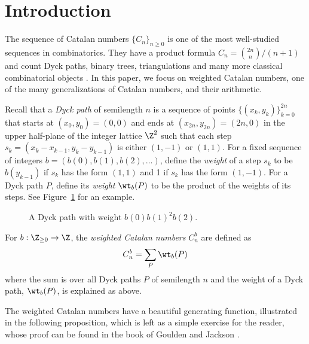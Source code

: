 
\section{Introduction}\label{sec:intro}
The sequence of Catalan numbers $\{C_n\}_{n\geq0}$ is one of the most well-studied sequences in combinatorics. They have a product formula $C_n=\binom{2n}{n}/(n+1)$ and count Dyck paths, binary trees, triangulations and many more classical combinatorial objects \cite{stanley2015catalan}. In this paper, we focus on weighted Catalan numbers, one of the many generalizations of Catalan numbers, and their arithmetic.

Recall that a \textit{Dyck path} of semilength $n$ is a sequence of points $\{(x_k,y_k)\}_{k=0}^{2n}$ that starts at $(x_0,y_0)=(0,0)$ and ends at $(x_{2n},y_{2n})=(2n,0)$  in the upper half-plane of the integer lattice $\Z^2$ such that each step $s_k=(x_{k}-x_{k-1},y_{k}-y_{k-1})$ is either $(1,-1)$ or $(1,1)$. For a fixed sequence of integers $b=(b(0),b(1),b(2),\ldots)$, define the \textit{weight} of a step $s_k$ to be $b(y_{k-1})$ if $s_k$ has the form $(1,1)$ and 1 if $s_k$ has the form $(1,-1)$. For a Dyck path $P$, define its \textit{weight} $\wt_b(P)$ to be the product of the weights of its steps. See Figure~\ref{fig:dyckpath} for an example.
\begin{figure}[h!]
\centering
{}
\caption{A Dyck path with weight $b(0)b(1)^2b(2)$.}
\label{fig:dyckpath}
\end{figure}
\begin{definition}
For $b:\Z_{\geq0}\rightarrow\Z$, the \textit{weighted Catalan numbers} $C_n^b$ are defined as
\[C_n^b=\sum_{P}\wt_b(P)\]
where the sum is over all Dyck paths $P$ of semilength $n$ and the weight of a Dyck path, $\wt_b(P)$, is explained as above.
\end{definition}
The weighted Catalan numbers have a beautiful generating function, illustrated in the following proposition, which is left as a simple exercise for the reader, whose proof can be found in the book of Goulden and Jackson \cite{goulden2004combinatorial}.
